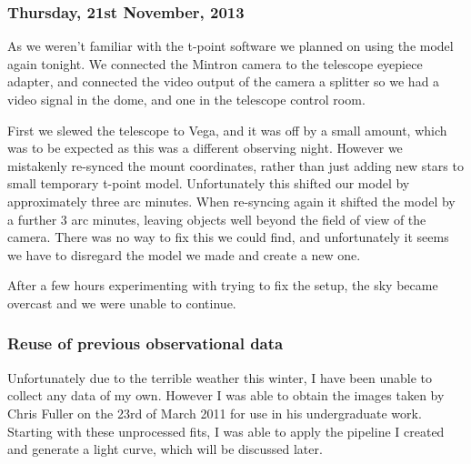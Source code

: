 \subsubsection*{Thursday, 21st November, 2013}

As we weren't familiar with the t-point software we planned on using the model again tonight. We connected the Mintron camera to the telescope eyepiece adapter, and connected the video output of the camera a splitter so we had a video signal in the dome, and one in the telescope control room.

First we slewed the telescope to Vega, and it was off by a small amount, which was to be expected as this was a different observing night. However we mistakenly re-synced the mount coordinates, rather than just adding new stars to small temporary t-point model. Unfortunately this shifted our model by approximately three arc minutes. When re-syncing again it shifted the model by a further 3 arc minutes, leaving objects well beyond the field of view of the camera. There was no way to fix this we could find, and unfortunately it seems we have to disregard the model we made and create a new one.

After a few hours experimenting with trying to fix the setup, the sky became overcast and we were unable to continue.

\subsubsection{Reuse of previous observational data}

Unfortunately due to the terrible weather this winter, I have been unable to collect any data of my own. However I was able to obtain the images taken by Chris Fuller on the 23rd of March 2011 for use in his undergraduate work. Starting with these unprocessed fits, I was able to apply the pipeline I created and generate a light curve, which will be discussed later.